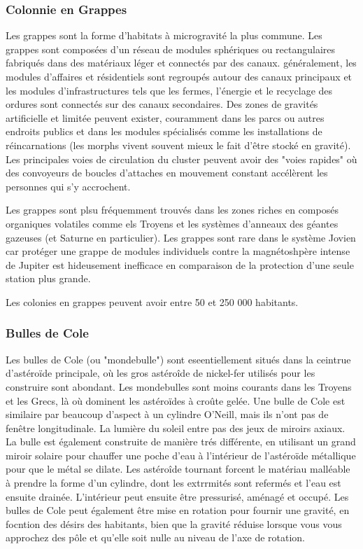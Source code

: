 \subsubsection{Colonnie en Grappes} 

Les grappes sont la forme d'habitats à microgravité la plus commune. Les grappes sont composées d'un réseau de modules sphériques ou rectangulaires fabriqués dans des matériaux léger et connectés par des canaux. généralement, les modules d'affaires et résidentiels sont regroupés autour des canaux principaux et les modules d'infrastructures tels que les fermes, l'énergie et le recyclage des ordures sont connectés sur des canaux secondaires. Des zones de gravités artificielle et limitée peuvent exister, couramment dans les parcs ou autres endroits publics et dans les modules spécialisés comme les installations de réincarnations (les morphs vivent souvent mieux le fait d'être stocké en gravité). Les principales voies de circulation du cluster peuvent avoir des "voies rapides" où des convoyeurs de boucles d'attaches en mouvement constant accélèrent les personnes qui s'y accrochent. 



Les grappes sont plsu fréquemment trouvés dans les zones riches en composés organiques volatiles comme els Troyens et les systèmes d'anneaux des géantes gazeuses (et Saturne en particulier). Les grappes sont rare dans le système Jovien car protéger une grappe de modules individuels contre la magnétoshpère intense de Jupiter est hideusement inefficace en comparaison de la protection d'une seule station plus grande. 

Les colonies en grappes peuvent avoir entre 50 et 250 000 habitants. 

\subsubsection{Bulles de Cole} 

Les bulles de Cole (ou "mondebulle") sont eseentiellement situés dans la ceintrue d'astéroïde principale, où les gros astéroîde de nickel-fer utilisés pour les construire sont abondant. Les mondebulles sont moins courants dans les Troyens et les Grecs, là où dominent les astéroïdes à croûte gelée. Une bulle de Cole est similaire par beaucoup d'aspect à un cylindre O'Neill, mais ils n'ont pas de fenêtre longitudinale. La lumière du soleil entre pas des jeux de miroirs axiaux. La bulle est également construite de manière trés différente, en utilisant un grand miroir solaire pour chauffer une poche d'eau à l'intérieur de l'astéroïde métallique pour que le métal se dilate. Les astéroîde tournant forcent le matériau malléable à prendre la forme d'un cylindre, dont les extrrmités sont refermés et l'eau est ensuite drainée. L'intérieur peut ensuite être pressurisé, aménagé et occupé. Les bulles de Cole peut également être mise en rotation pour fournir une gravité, en focntion des désirs des habitants, bien que la gravité réduise lorsque vous vous approchez des pôle et qu'elle soit nulle au niveau de l'axe de rotation. 

